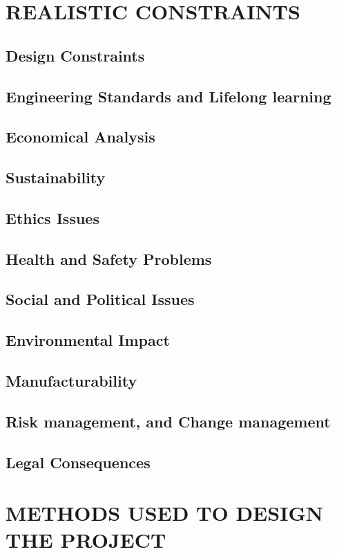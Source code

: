 \documentclass[a4paper,12pt]{extreport}
\begin{document}


\chapter{REALISTIC CONSTRAINTS}
\section{Design Constraints }
\section{Engineering Standards and Lifelong learning }
\section{Economical Analysis}
\section{Sustainability}
\section{Ethics Issues}
\section{Health and Safety Problems}
\section{Social and Political Issues}
\section{Environmental Impact}
\section{Manufacturability}
\section{Risk management, and Change management}
\section{Legal Consequences}
\chapter{METHODS USED TO DESIGN THE PROJECT}
\end{document}
